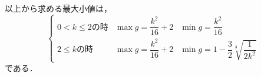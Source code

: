 \documentclass[a4j]{jarticle}
\begin{document}
\begin{multicols}{2}
以上から求める最大小値は，
     \[\left\{
          \begin{array}{lll}
          0<k\le 2\text{の時}　& \max g=\dfrac{k^2}{16}+2 &  \min g=\dfrac{k^2}{16}  \\
          2\le k\text{の時} & \max g=\dfrac{k^2}{16}+2 & \min g=1-\dfrac{3}{2}\sqrt[3]%
          {\dfrac{1}{2k^2}}
          \end{array}
     \right.\]
である．
\newpage
\end{multicols}
\end{document}
